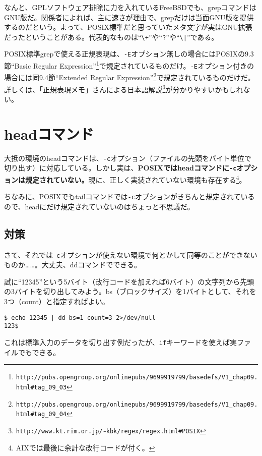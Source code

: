 なんと、GPLソフトウェア排除に力を入れているFreeBSDでも、grepコマンドはGNU版だ。関係者によれば、主に速さが理由で、grepだけは当面GNU版を提供するのだという。よって、POSIX標準だと思っていたメタ文字が実はGNU拡張だったということがある。代表的なものは``\verb|\+|''や``\verb|?|''や``\verb!\|!''である。

POSIX標準grepで使える正規表現は、\verb|-E|オプション無しの場合にはPOSIXの9.3節``Basic Regular Expression''\footnote{\verb|http://pubs.opengroup.org/onlinepubs/9699919799/basedefs/V1_chap09.html#tag_09_03|}で規定されているものだけ。\verb|-E|オプション付きの場合には同9.4節``Extended Regular Expression''\footnote{\verb|http://pubs.opengroup.org/onlinepubs/9699919799/basedefs/V1_chap09.html#tag_09_04|}で規定されているものだけだ。詳しくは、「正規表現メモ」さんによる日本語解説\footnote{\verb|http://www.kt.rim.or.jp/~kbk/regex/regex.html#POSIX|}が分かりやすいかもしれない。

\section{headコマンド}

大抵の環境のheadコマンドは、\verb|-c|オプション（ファイルの先頭をバイト単位で切り出す）に対応している。しかし実は、\textbf{POSIXではheadコマンドに\verb|-c|オプションは規定されていない。}現に、正しく実装されていない環境も存在する\footnote{AIXでは最後に余計な改行コードが付く。}。

ちなみに、POSIXでもtailコマンドでは\verb|-c|オプションがきちんと規定されているので、headにだけ規定されていないのはちょっと不思議だ。

\subsection*{対策}

さて、それでは\verb|-c|オプションが使えない環境で何とかして同等のことができないものか……。大丈夫、ddコマンドでできる。

試に``12345''という5バイト（改行コードを加えれば6バイト）の文字列から先頭の3バイトを切り出してみよう。bs（ブロックサイズ）を1バイトとして、それを3つ（count）と指定すればよい。

\begin{screen}
	\verb!$ echo 12345 | dd bs=1 count=3 2>/dev/null! \return \\
	\verb|123$ |
\end{screen}

これは標準入力のデータを切り出す例だったが、\verb|if|キーワードを使えば実ファイルでもできる。

